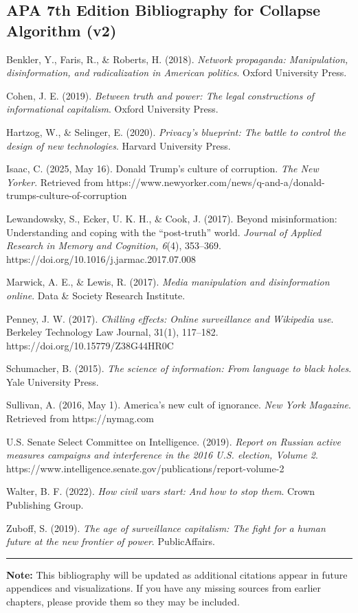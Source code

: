 \documentclass[
]{article}
\author{}
\date{}
\begin{document}
\subsection{APA 7th Edition Bibliography for Collapse Algorithm (v2)}\label{apa-7th-edition-bibliography-for-collapse-algorithm-v2}

Benkler, Y., Faris, R., \& Roberts, H. (2018). \emph{Network propaganda: Manipulation, disinformation, and radicalization in American politics}. Oxford University Press.

Cohen, J. E. (2019). \emph{Between truth and power: The legal constructions of informational capitalism}. Oxford University Press.

Hartzog, W., \& Selinger, E. (2020). \emph{Privacy's blueprint: The battle to control the design of new technologies}. Harvard University Press.

Isaac, C. (2025, May 16). Donald Trump's culture of corruption. \emph{The New Yorker}. Retrieved from https://www.newyorker.com/news/q-and-a/donald-trumps-culture-of-corruption

Lewandowsky, S., Ecker, U. K. H., \& Cook, J. (2017). Beyond misinformation: Understanding and coping with the ``post-truth'' world. \emph{Journal of Applied Research in Memory and Cognition, 6}(4), 353--369. https://doi.org/10.1016/j.jarmac.2017.07.008

Marwick, A. E., \& Lewis, R. (2017). \emph{Media manipulation and disinformation online}. Data \& Society Research Institute.

Penney, J. W. (2017). \emph{Chilling effects: Online surveillance and Wikipedia use}. Berkeley Technology Law Journal, 31(1), 117--182. https://doi.org/10.15779/Z38G44HR0C

Schumacher, B. (2015). \emph{The science of information: From language to black holes}. Yale University Press.

Sullivan, A. (2016, May 1). America's new cult of ignorance. \emph{New York Magazine}. Retrieved from https://nymag.com

U.S. Senate Select Committee on Intelligence. (2019). \emph{Report on Russian active measures campaigns and interference in the 2016 U.S. election, Volume 2}. https://www.intelligence.senate.gov/publications/report-volume-2

Walter, B. F. (2022). \emph{How civil wars start: And how to stop them}. Crown Publishing Group.

Zuboff, S. (2019). \emph{The age of surveillance capitalism: The fight for a human future at the new frontier of power}. PublicAffairs.

\begin{center}\rule{0.5\linewidth}{0.5pt}\end{center}

\textbf{Note:} This bibliography will be updated as additional citations appear in future appendices and visualizations. If you have any missing sources from earlier chapters, please provide them so they may be included.
\end{document}
